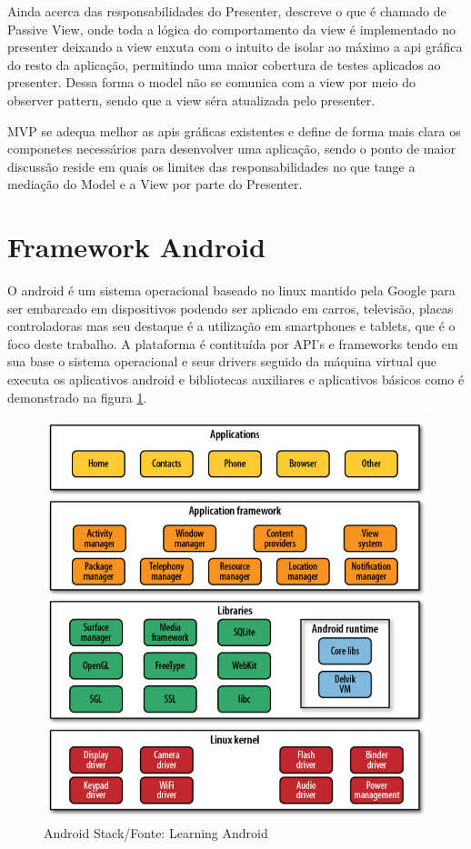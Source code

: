 Ainda acerca das responsabilidades do Presenter,  descreve
o que é chamado de Passive View, onde toda a lógica do comportamento da view é
implementado no presenter deixando a view enxuta com o intuito de isolar ao
máximo a api gráfica do resto da aplicação, permitindo uma maior cobertura de
testes aplicados ao presenter. Dessa forma o model não se comunica com a view
por meio do observer pattern, sendo que a view séra atualizada pelo presenter.


MVP se adequa melhor as apis gráficas existentes e define de forma mais clara os
componetes necessários para desenvolver uma aplicação, sendo o ponto de maior
discussão reside em quais os limites das responsabilidades no que tange a
mediação do Model e a View por parte do Presenter.

\section{Framework Android}
 

O android é um sistema operacional baseado no linux mantido pela Google para
ser embarcado em dispositivos podendo ser aplicado em carros, televisão, placas
controladoras mas seu destaque é a utilização em smartphones e
tablets, que é o foco deste trabalho. A plataforma é contituída por API's e
frameworks tendo em sua base o sistema operacional e seus drivers seguido da
máquina virtual que executa os aplicativos android e bibliotecas auxiliares e
aplicativos básicos como é demonstrado na figura \ref{android_stack}.

\begin{figure}[h]
	\centering
	\includegraphics[scale=0.5]{img/android_stack.png}
	\caption{Android Stack/Fonte: Learning Android}
	\label{android_stack}
\end{figure}

